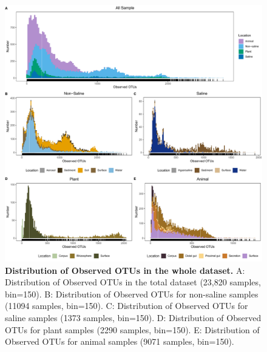 \begin{figure}[H]
    \centering
    \includegraphics[scale=0.33]{./Figures/OO_hist_empo2}
    \caption{\textbf{Distribution of Observed OTUs in the whole dataset.} A: Distribution of Observed OTUs in the total dataset (23,820 samples, bin=150). B: Distribution of Observed OTUs for non-saline samples (11094 samples, bin=150). C: Distribution of Observed OTUs for saline samples (1373 samples, bin=150). D: Distribution of Observed OTUs for plant samples (2290 samples, bin=150). E: Distribution of Observed OTUs for animal samples (9071 samples, bin=150).}
    \label{fig:OO_hist}
\end{figure}

